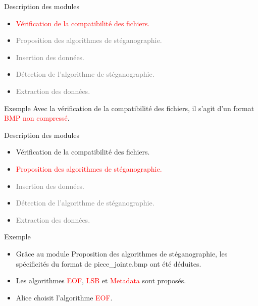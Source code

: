 \documentclass{beamer}
\begin{document}
  \begin{frame} %
	\begin{block}{Description des modules}
	\begin{itemize}
	[circle]
	\item \textcolor{red}{Vérification de la compatibilité des fichiers.}
	\item \textcolor{gray} {Proposition des algorithmes de stéganographie.}
	\item \textcolor{gray} {Insertion des données.}
	\item \textcolor{gray} {Détection de l'algorithme de stéganographie.}
	\item \textcolor{gray} {Extraction des données.}
	\end{itemize}
	\end{block}
	
	\begin{exampleblock}{Exemple} 
	Avec la vérification de la compatibilité des fichiers, il s'agit d'un 
	format \textcolor{red}{BMP non compressé}.  
	\end{exampleblock}
  \end{frame}
  
  \begin{frame} %
	\begin{block}{Description des modules}
	\begin{itemize}
	[circle]
	\item Vérification de la compatibilité des fichiers.
	\item \textcolor{red}{Proposition des algorithmes de stéganographie.}
	\item \textcolor{gray} {Insertion des données.}
	\item \textcolor{gray} {Détection de l'algorithme de stéganographie.}
	\item \textcolor{gray} {Extraction des données.}
	\end{itemize}
	\end{block}
	
	\begin{exampleblock}{Exemple} 
	\begin{itemize}
	[circle]
	\item Grâce au module Proposition des algorithmes de stéganographie, les 
	spécificités du format de piece\_jointe.bmp ont été déduites. 
	\item Les algorithmes \textcolor{red}{EOF}, \textcolor{red}{LSB} et 
	\textcolor{red}{Metadata} sont proposés. 
	\item Alice choisit l'algorithme \textcolor{red}{EOF}. 
	\end{itemize}
	
	\end{exampleblock}
  \end{frame}
  
\end{document}
